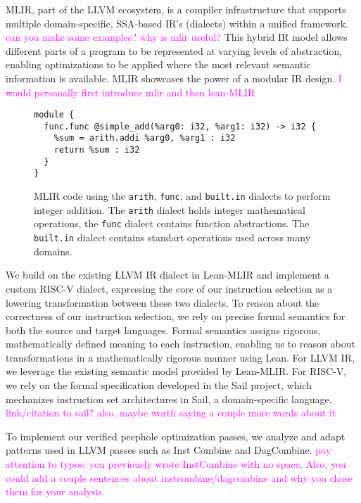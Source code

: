 MLIR, part of the LLVM ecosystem, is a compiler infrastructure that supports multiple domain-specific, 
SSA-based IR's (dialects) within a unified framework. \textcolor{magenta}{can you make some examples? why is mlir useful?}
This hybrid IR model allows different parts of a program to be represented at varying levels of abstraction, 
enabling optimizations to be applied where the most relevant semantic information is available. 
MLIR showcases the power of a modular IR design.
\textcolor{magenta}{I would personally first introduce mlir and then lean-MLIR}
\begin{figure}[ht]
\centering
\begin{lstlisting}[language=mlir, basicstyle=\ttfamily\small]
module {
  func.func @simple_add(%arg0: i32, %arg1: i32) -> i32 {
    %sum = arith.addi %arg0, %arg1 : i32
    return %sum : i32
  }
}

\end{lstlisting}
\caption{ MLIR code using the \texttt{arith}, \texttt{func},  and \texttt{built.in} dialects to perform integer addition. The \texttt{arith} dialect holds integer mathematical operations, the \texttt{func} dialect contains function abstractions. The \texttt{built.in} dialect contains standart operations used across many domains.}
\label{fig:mlir-addition}
\end{figure}

We build on the existing LLVM IR dialect in Lean-MLIR and implement a custom RISC-V dialect, 
expressing the core of our instruction selection as a lowering transformation between these two dialects. 
To reason about the correctness of our instruction selection, we rely on precise formal semantics 
for both the source and target languages. Formal semantics assigns rigorous, mathematically defined meaning to 
each instruction, enabling us to reason about transformations in a mathematically rigorous manner using Lean. 
For LLVM IR, we leverage the existing semantic model provided by Lean-MLIR. 
For RISC-V, we rely on the formal specification developed in the Sail project, which mechanizes instruction set 
architectures in Sail, a domain-specific language. \textcolor{magenta}{link/citation to sail? 
also, maybe worth saying a couple more words about it}

To implement our verified peephole optimization passes, we analyze and adapt patterns used in LLVM passes such as Inst Combine and DagCombine.
\textcolor{magenta}{pay attention to typos: you previously wrote InstCombine with no space. Also, you could add a couple 
sentences about instcombine/dagcombine and why you chose them for your analysis.}

